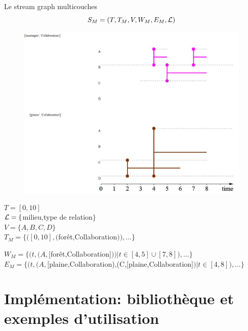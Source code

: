 \documentclass[15pt]{beamer}
\def \stgm {stream graph multicouches}
\begin{document}
\begin{frame}{Le \stgm{}}
	\[
		S_M=(T,T_M,V,W_M,E_M,\cal{L})
	\]
	\begin{minipage}{0.59\linewidth}
		\begin{figure}
    		\centering
    		\includegraphics[width=\linewidth]{img/exMultiStream.JPG}
		\end{figure}
	\end{minipage}
	\begin{minipage}{0.4\textwidth}
		\begin{footnotesize}
			$T=[0,10]$\\ \pause
			${\cal L} = \{$milieu,type de relation$\}$\\ \pause
			$V=\{A,B,C,D\}$\\ \pause
			$T_M= \{([0,10],($forêt,Collaboration$)), \dots \}$\pause
		\end{footnotesize}
	\end{minipage}

	\begin{footnotesize}
		$W_M = \{ (t,(A,[$forêt,Collaboration$]))| t \in [4,5]\cup[7,8]), \dots \}$ \pause
		\\
		$E_M= \{ (t,(A,[$plaine,Collaboration),(C,[plaine,Collaboration$])| t \in [4,8]), \dots \}$
	\end{footnotesize}
\end{frame}

\section{Implémentation: bibliothèque et exemples d'utilisation}
\end{document}
